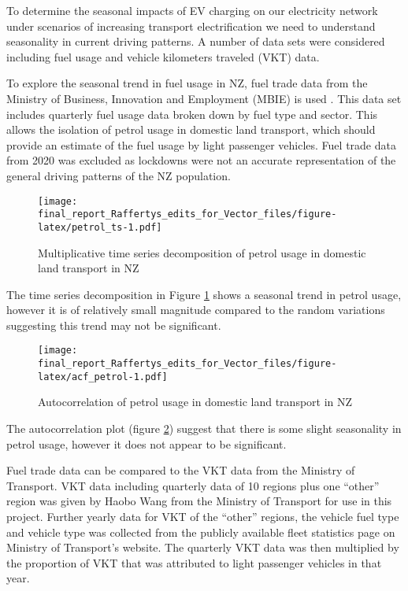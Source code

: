 \documentclass[
]{article}
\begin{document}
To determine the seasonal impacts of EV charging on our electricity
network under scenarios of increasing transport electrification we need
to understand seasonality in current driving patterns. A number of data
sets were considered including fuel usage and vehicle kilometers
traveled (VKT) data.

To explore the seasonal trend in fuel usage in NZ, fuel trade data from
the Ministry of Business, Innovation and Employment (MBIE) is used
\cite{fuel_trade}. This data set includes quarterly fuel usage data
broken down by fuel type and sector. This allows the isolation of petrol
usage in domestic land transport, which should provide an estimate of
the fuel usage by light passenger vehicles. Fuel trade data from 2020
was excluded as lockdowns were not an accurate representation of the
general driving patterns of the NZ population.

\begin{figure}
\centering
\texttt{[image: final\_report\_Raffertys\_edits\_for\_Vector\_files/figure-latex/petrol\_ts-1.pdf]}
\caption{Multiplicative time series decomposition of petrol usage in
domestic land transport in NZ\label{fig:petrol_ts}}
\end{figure}

The time series decomposition in Figure \ref{fig:petrol_ts} shows a
seasonal trend in petrol usage, however it is of relatively small
magnitude compared to the random variations suggesting this trend may
not be significant.

\begin{figure}
\centering
\texttt{[image: final\_report\_Raffertys\_edits\_for\_Vector\_files/figure-latex/acf\_petrol-1.pdf]}
\caption{Autocorrelation of petrol usage in domestic land transport in
NZ\label{fig:acf_petrol}}
\end{figure}

The autocorrelation plot (figure \ref{fig:acf_petrol}) suggest that
there is some slight seasonality in petrol usage, however it does not
appear to be significant.

Fuel trade data can be compared to the VKT data from the Ministry of
Transport. VKT data including quarterly data of 10 regions plus one
``other'' region was given by Haobo Wang from the Ministry of Transport
for use in this project. Further yearly data for VKT of the ``other''
regions, the vehicle fuel type and vehicle type was collected from the
publicly available fleet statistics page on Ministry of Transport's
website. The quarterly VKT data was then multiplied by the proportion of
VKT that was attributed to light passenger vehicles in that year.
\end{document}
